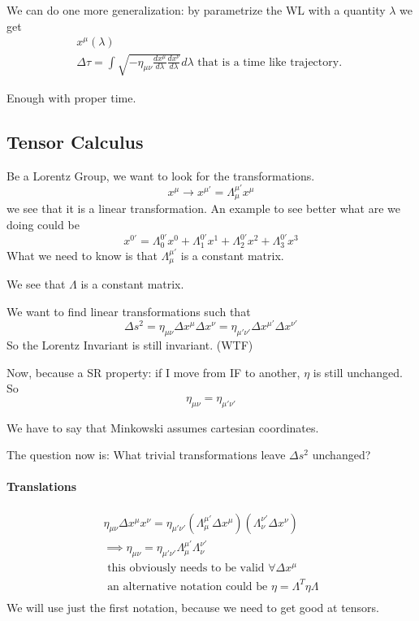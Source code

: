 \documentclass{report}
\begin{document}
We can do one more generalization: by parametrize the WL with a quantity $\lambda $ we get
\begin{gather*}
x^{\mu }\left( \lambda  \right) \\
\Delta \tau = \int \sqrt{- \eta_{\mu \nu } \frac{dx^{\mu }}{d\lambda } \frac{dx^{\nu }}{d\lambda }} d\lambda \text{ that is a time like trajectory. }
\end{gather*}

Enough with proper time.

\subsection{Tensor Calculus}
Be a Lorentz Group, we want to look for the transformations.
\begin{equation}
x^{\mu } \to x^{\mu'} = \Lambda^{\mu'}_{\mu } x^{\mu }
\end{equation}
we see that it is a linear transformation. An example to see better what are we doing could be
\begin{equation}
x^{0'} = \Lambda^{0'}_{0}x^{0} + \Lambda^{0'}_{1}x^{1} + \Lambda^{0'}_{2}x^{2} + \Lambda^{0'}_{3}x^{3}
\end{equation}
What we need to know is that $\Lambda^{\mu'}_{\mu }$ is a constant matrix.

We see that $\Lambda $   is a constant matrix.

We want to find linear transformations such that 
\begin{equation}
\Delta s^{2} = \eta_{\mu \nu } \Delta x^{\mu }\Delta x^{\nu } = \eta_{\mu' \nu'} \Delta x^{\mu'}\Delta x^{\nu'}
\end{equation}
So the Lorentz Invariant is still invariant. (WTF)

Now, because a SR property: if I move from IF to another, $\eta$ is still unchanged. So \[
\eta_{\mu \nu } = \eta_{\mu' \nu'}
\]

We have to say that Minkowski assumes cartesian coordinates.

The question now is: What trivial transformations leave $\Delta s^{2}$ unchanged?

\paragraph{Translations}
\begin{gather*}
\eta_{\mu  \nu }\Delta x^{\mu }x^{\nu } = \eta_{\mu' \nu'}\left( \Lambda^{\mu'}_{\mu }\Delta x^{\mu } \right) \left( \Lambda^{\nu'}_{\nu }\Delta x^{\nu } \right) \\
\implies \eta_{\mu  \nu } = \eta_{\mu' \nu'} \Lambda^{\mu'}_{\mu }\Lambda^{\nu'}_{\nu } \\
\text{ this obviously needs to be valid } \forall \Delta x^{\mu } \\
\text{ an alternative notation could be } \eta = \Lambda^{T} \eta \Lambda \\
\end{gather*}
We will use just the first notation, because we need to get good at tensors.
\end{document}
